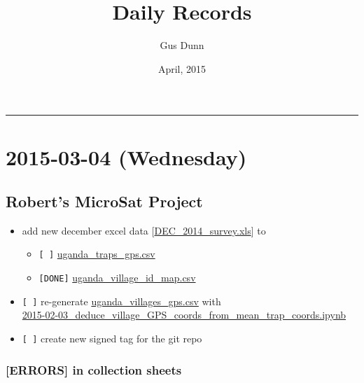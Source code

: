 \documentclass[letterpaper]{scrartcl}
\title{Daily Records\\\vspace{0.5em}{\large Caccone PostDoc}}
\author{Gus Dunn}
\date{April, 2015}
\begin{document}
\maketitle

{
\hypersetup{linkcolor=black}
\setcounter{tocdepth}{3}
\tableofcontents
}
\begin{center}\rule{0.5\linewidth}{\linethickness}\end{center}

\section{2015-03-04 (Wednesday)}\label{wednesday}

\subsection{Robert's MicroSat Project}\label{roberts-microsat-project}

\begin{itemize}
\itemsep1pt\parskip0pt
\item
  add new december excel data
  {[}\href{file:///home/gus/Dropbox/uganda_data/2014_Dec_new/DEC_2014_survey.xls}{DEC\_2014\_survey.xls}{]}
  to

  \begin{itemize}
  \itemsep1pt\parskip0pt
  \item
    \texttt{{[} {]}}
    \href{file:///home/gus/Dropbox/uganda_data/data_repos/field_data/locations/gps/traps/uganda_traps_gps.csv}{uganda\_traps\_gps.csv}
  \item
    \texttt{{[}DONE{]}}
    \href{file:///home/gus/Dropbox/uganda_data/data_repos/field_data/locations/names/uganda_village_id_map.csv}{uganda\_village\_id\_map.csv}
  \end{itemize}
\item
  \texttt{{[} {]}} re-generate
  \href{file:///home/gus/Dropbox/uganda_data/data_repos/field_data/locations/gps/villages/uganda_villages_gps.csv}{uganda\_villages\_gps.csv}
  with\\\href{file:///home/gus/Dropbox/repos/git/ipy_notebooks/YALE/maps_stuff/2015-02-03_deduce_village_GPS_coords_from_mean_trap_coords.ipynb}{2015-02-03\_deduce\_village\_GPS\_coords\_from\_mean\_trap\_coords.ipynb}
\item
  \texttt{{[} {]}} create new signed tag for the git repo
\end{itemize}

\subsubsection{\textbf{{[}ERRORS{]}} in collection
sheets}\label{errors-in-collection-sheets}
\end{document}
